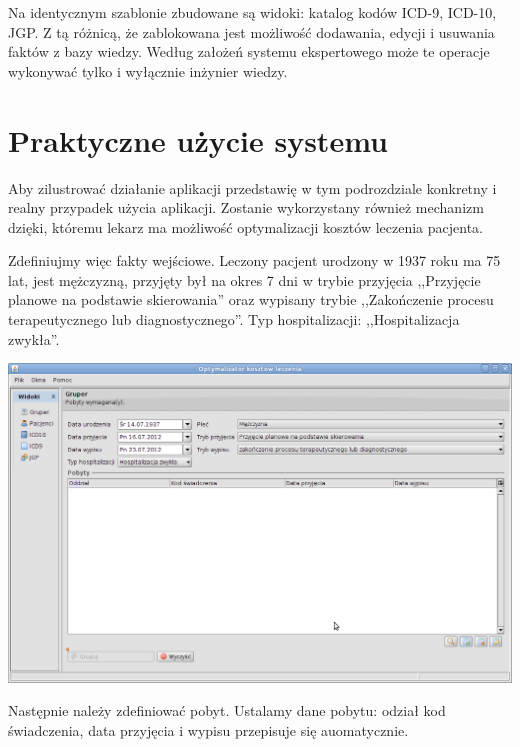 Na identycznym szablonie zbudowane są widoki: katalog kodów ICD-9, ICD-10, JGP. Z tą różnicą, że zablokowana jest możliwość dodawania, edycji i usuwania faktów z bazy wiedzy. Według założeń systemu ekspertowego może te operacje wykonywać tylko i wyłącznie inżynier wiedzy.


\section{Praktyczne użycie systemu}
\label{sec:praktyczneUzycieSystemu}
Aby zilustrować działanie aplikacji przedstawię w tym podrozdziale konkretny i realny przypadek użycia aplikacji. Zostanie wykorzystany również mechanizm dzięki, któremu lekarz ma możliwość optymalizacji kosztów leczenia pacjenta.

Zdefiniujmy więc fakty wejściowe. Leczony pacjent urodzony w 1937 roku ma 75 lat, jest mężczyzną, przyjęty był na okres 7 dni w trybie przyjęcia ,,Przyjęcie planowe na podstawie skierowania'' oraz wypisany trybie ,,Zakończenie procesu terapeutycznego lub diagnostycznego''. Typ hospitalizacji: ,,Hospitalizacja zwykła''.

\includegraphics[scale=0.4]{images/gruper1}

Następnie należy zdefiniować pobyt. Ustalamy dane pobytu: odział kod świadczenia, data przyjęcia i wypisu przepisuje się auomatycznie.

